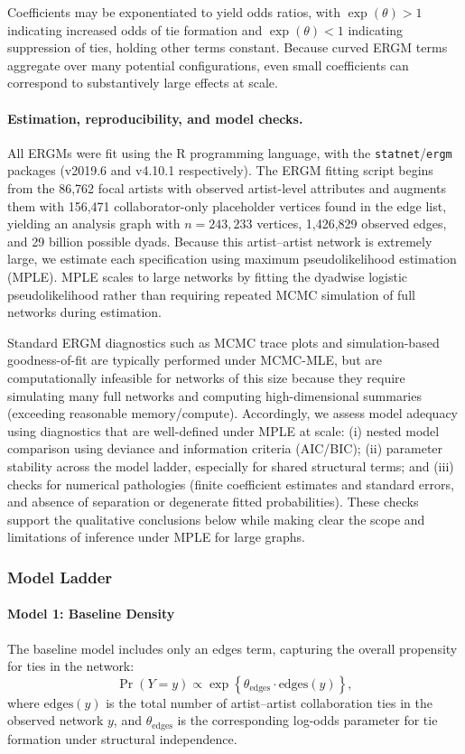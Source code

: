 \documentclass[fleqn,10pt]{wlscirep}
\begin{document}
Coefficients may be exponentiated to yield odds ratios, with $\exp(\theta)>1$ indicating increased odds of tie formation and $\exp(\theta)<1$ indicating suppression of ties, holding other terms constant. Because curved ERGM terms aggregate over many potential configurations, even small coefficients can correspond to substantively large effects at scale.

\paragraph*{Estimation, reproducibility, and model checks.}
All ERGMs were fit using the R programming language, with the \texttt{statnet}/\texttt{ergm} packages (v2019.6 and v4.10.1 respectively). The ERGM fitting script begins from the 86,762 focal artists with observed artist-level attributes and augments them with 156,471 collaborator-only placeholder vertices found in the edge list, yielding an analysis graph with $n=243{,}233$ vertices, 1,426,829 observed edges, and 29 billion possible dyads. Because this artist--artist network is extremely large, we estimate each specification using maximum pseudolikelihood estimation (MPLE). MPLE scales to large networks by fitting the dyadwise logistic pseudolikelihood rather than requiring repeated MCMC simulation of full networks during estimation.

Standard ERGM diagnostics such as MCMC trace plots and simulation-based goodness-of-fit are typically performed under MCMC-MLE, but are computationally infeasible for networks of this size because they require simulating many full networks and computing high-dimensional summaries (exceeding reasonable memory/compute). Accordingly, we assess model adequacy using diagnostics that are well-defined under MPLE at scale: (i) nested model comparison using deviance and information criteria (AIC/BIC); (ii) parameter stability across the model ladder, especially for shared structural terms; and (iii) checks for numerical pathologies (finite coefficient estimates and standard errors, and absence of separation or degenerate fitted probabilities). These checks support the qualitative conclusions below while making clear the scope and limitations of inference under MPLE for large graphs.

\subsubsection*{Model Ladder}

\paragraph*{Model 1: Baseline Density}
The baseline model includes only an edges term, capturing the overall propensity for ties in the network:
\begin{equation}
\Pr(Y = y) \propto 
\exp\left\{
    \theta_{\text{edges}} \cdot \text{edges}(y)
\right\},
\label{eq:model0-intext}
\end{equation}
where $\text{edges}(y)$ is the total number of artist--artist collaboration ties in the observed network $y$, and $\theta_{\text{edges}}$ is the corresponding log-odds parameter for tie formation under structural independence.
\end{document}
